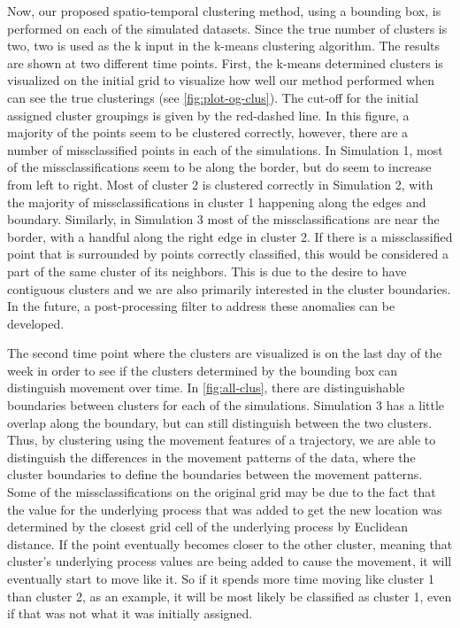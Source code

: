 \documentclass[12pt]{article}
\begin{document}
Now, our proposed spatio-temporal clustering method, using a bounding
box, is performed on each of the simulated datasets. Since the true
number of clusters is two, two is used as the k input in the k-means
clustering algorithm. The results are shown at two different time
points. First, the k-means determined clusters is visualized on the
initial grid to visualize how well our method performed when can see the
true clusterings (see \cref{fig:plot-og-clus}). The cut-off for the
initial assigned cluster groupings is given by the red-dashed line. In
this figure, a majority of the points seem to be clustered correctly,
however, there are a number of missclassified points in each of the
simulations. In Simulation 1, most of the missclassifications seem to be
along the border, but do seem to increase from left to right. Most of
cluster 2 is clustered correctly in Simulation 2, with the majority of
missclassifications in cluster 1 happening along the edges and boundary.
Similarly, in Simulation 3 most of the missclassifications are near the
border, with a handful along the right edge in cluster 2. If there is a
missclassified point that is surrounded by points correctly classified,
this would be considered a part of the same cluster of its neighbors.
This is due to the desire to have contiguous clusters and we are also
primarily interested in the cluster boundaries. In the future, a
post-processing filter to address these anomalies can be developed.

The second time point where the clusters are visualized is on the last
day of the week in order to see if the clusters determined by the
bounding box can distinguish movement over time. In \cref{fig:all-clus},
there are distinguishable boundaries between clusters for each of the
simulations. Simulation 3 has a little overlap along the boundary, but
can still distinguish between the two clusters. Thus, by clustering
using the movement features of a trajectory, we are able to distinguish
the differences in the movement patterns of the data, where the cluster
boundaries to define the boundaries between the movement patterns. Some
of the missclassifications on the original grid may be due to the fact
that the value for the underlying process that was added to get the new
location was determined by the closest grid cell of the underlying
process by Euclidean distance. If the point eventually becomes closer to
the other cluster, meaning that cluster's underlying process values are
being added to cause the movement, it will eventually start to move like
it. So if it spends more time moving like cluster 1 than cluster 2, as
an example, it will be most likely be classified as cluster 1, even if
that was not what it was initially assigned.
\end{document}
